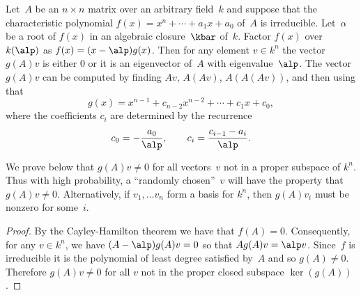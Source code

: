 \documentclass{report}
\begin{document}
\begin{algorithm}\label{alg:eigenvector}
Let~$A$ be an $n\times n$ matrix over an arbitrary field~$k$ and
suppose that the characteristic polynomial $f(x)=x^n+\cdots+a_1 x + a_0$
of~$A$ is irreducible.   Let~$\alpha$ be a root of $f(x)$
in an algebraic closure~$\kbar$ of~$k$.
Factor $f(x)$ over $k(\alp)$ as
 $f(x) = (x-\alp) g(x)$.
Then for any element $v\in k^n$ the vector
$g(A)v$ is either $0$ or it is an eigenvector of~$A$ with eigenvalue~$\alp$.
The vector $g(A)v$ can be computed by finding
$Av$, $A(Av)$, $A(A(Av))$, and then using that
  $$g(x)=x^{n-1}+c_{n-2} x^{n-2}+\cdots+c_1 x+ c_0,$$
where the coefficients $c_i$ are determined by the recurrence
$$c_0 = - \frac{a_0}{\alp},\qquad  c_i = \frac{c_{i-1}-a_i}{\alp}.$$

We prove below that $g(A)v\neq 0$ for all vectors~$v$ not
in a proper subspace of $k^n$.  Thus with high probability, a
``randomly chosen''~$v$ will have the property that $g(A)v\neq 0$.
Alternatively, if $v_1,\ldots v_n$ form a basis for $k^n$, then
$g(A)v_i$ must be nonzero for some~$i$.
\end{algorithm}
\begin{proof}
By the Cayley-Hamilton theorem \cite[XIV.3]{lang:algebra} we have
that $f(A)=0$.  Consequently, for any $v\in k^n$, we have
$(A-\alp)g(A)v=0$ so that $A g(A)v = \alp v$. Since~$f$ is
irreducible it is the polynomial of least degree satisfied by~$A$
and so $g(A)\neq 0$. Therefore $g(A)v\neq 0$ for all $v$ not in
the proper closed subspace $\ker(g(A))$.
\end{proof}
\end{document}
